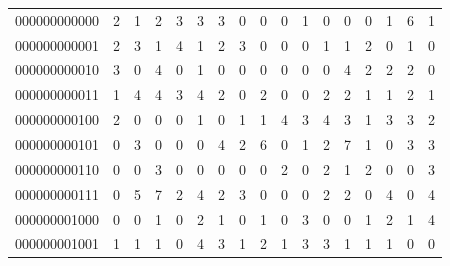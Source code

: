 \documentclass[10pt,a4paper]{article}
\begin{document}
\begin{longtable}{ |c|c|c|c|c|c|c|c|c|c|c|c|c|c|c|c|c| }
    \hline
    \endfoot
    000000000000              & 2                            & 1                                & 2                            & 3                              & 3   & 3   & 0   & 0   & 0   & 1   & 0   & 0   & 0   & 1   & 6   & 1   \\
    000000000001              & 2                            & 3                                & 1                            & 4                              & 1   & 2   & 3   & 0   & 0   & 0   & 1   & 1   & 2   & 0   & 1   & 0   \\
    000000000010              & 3                            & 0                                & 4                            & 0                              & 1   & 0   & 0   & 0   & 0   & 0   & 0   & 4   & 2   & 2   & 2   & 0   \\
    000000000011              & 1                            & 4                                & 4                            & 3                              & 4   & 2   & 0   & 2   & 0   & 0   & 2   & 2   & 1   & 1   & 2   & 1   \\
    000000000100              & 2                            & 0                                & 0                            & 0                              & 1   & 0   & 1   & 1   & 4   & 3   & 4   & 3   & 1   & 3   & 3   & 2   \\
    000000000101              & 0                            & 3                                & 0                            & 0                              & 0   & 4   & 2   & 6   & 0   & 1   & 2   & 7   & 1   & 0   & 3   & 3   \\
    000000000110              & 0                            & 0                                & 3                            & 0                              & 0   & 0   & 0   & 0   & 2   & 0   & 2   & 1   & 2   & 0   & 0   & 3   \\
    000000000111              & 0                            & 5                                & 7                            & 2                              & 4   & 2   & 3   & 0   & 0   & 0   & 2   & 2   & 0   & 4   & 0   & 4   \\
    000000001000              & 0                            & 0                                & 1                            & 0                              & 2   & 1   & 0   & 1   & 0   & 3   & 0   & 0   & 1   & 2   & 1   & 4   \\
    000000001001              & 1                            & 1                                & 1                            & 0                              & 4   & 3   & 1   & 2   & 1   & 3   & 3   & 1   & 1   & 1   & 0   & 0   \\

\end{longtable}
\end{document}
